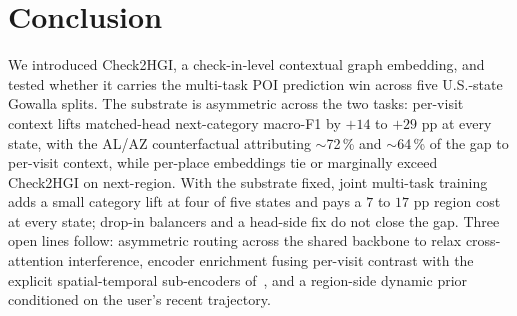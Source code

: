 \section{Conclusion}
\label{sec:conclusion}

We introduced Check2HGI, a check-in-level contextual graph embedding, and tested whether it carries the multi-task POI prediction win across five U.S.-state Gowalla splits. The substrate is asymmetric across the two tasks: per-visit context lifts matched-head next-category macro-F1 by $+14$ to $+29$ pp at every state, with the AL/AZ counterfactual attributing $\sim$72\,\% and $\sim$64\,\% of the gap to per-visit context, while per-place embeddings tie or marginally exceed Check2HGI on next-region. With the substrate fixed, joint multi-task training adds a small category lift at four of five states and pays a $7$ to $17$ pp region cost at every state; drop-in balancers and a head-side fix do not close the gap. Three open lines follow: asymmetric routing across the shared backbone to relax cross-attention interference, encoder enrichment fusing per-visit contrast with the explicit spatial-temporal sub-encoders of~\cite{paiva2026courb}, and a region-side dynamic prior conditioned on the user's recent trajectory.
